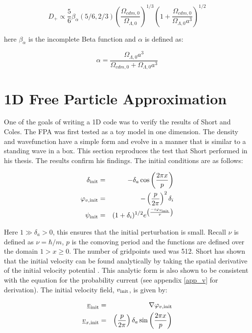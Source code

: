 \begin{equation}
\label{lingro}
D_+ \propto \frac{5}{6} \beta_{\alpha}(5/6, 2/3) \left(\frac{\Omega_{cdm,0}}{\Omega_{\Lambda,0}} \right)^{1/3} \left(1+\frac{\Omega_{cdm,0}}{\Omega_{\Lambda,0}a^3} \right)^{1/2} 
\end{equation}

\noindent here $\beta_{\alpha}$ is the incomplete Beta function and $\alpha$ is defined as:

\begin{equation}
\alpha =  \frac {\Omega_{\Lambda,0}a^3}{\Omega_{cdm,0} + \Omega_{\Lambda,0}a^3}
\end{equation}


\section{1D Free Particle Approximation}
\label{1dpfa}
One of the goals of writing a 1D code was to verify the results of Short and Coles. The FPA was first tested as a toy model in one dimension. The density and wavefunction have a simple form and evolve in a manner that is similar to a standing wave in a box. This section reproduces the test that Short performed in his thesis. The results confirm his findings. The initial conditions are as follows:

\begin{eqnarray}
\label{inits_fpa}
\delta_{\rm init} &=& - \delta_a \cos\left(\frac{2 \pi x}{p} \right) \nonumber \\
\varphi_{v,\rm init} &=& -\left(\frac{p}{2 \pi} \right)^2 \delta_i \nonumber \\
\psi_{\rm init} &=& (1+ \delta_i)^{1/2}e^{\left(\frac{-i\varphi_{v_{\rm init}}}{\nu}\right)}
\end{eqnarray}

\noindent Here $1 \gg \delta_a > 0$, this ensures that the initial perturbation is small. Recall $\nu$ is defined as $\nu = \hbar/m$, $p$ is the comoving period and the functions are defined over the domain $ 1 > x \ge 0$. The number of gridpoints used was 512. Short has shown that the initial velocity can be found analytically by taking the spatial derivative of the initial velocity potential \citep{bib_sho}. This analytic form is also shown to be consistent with the equation for the probability current (see appendix \ref{app_v} for derivation). The initial velocity field, $v_{\rm init}$, is given by:

\begin{eqnarray}
\underline{v}_{\rm init} &=& \nabla \varphi_{v,\rm init} \\
\underline{v}_{x,\rm init} &=& \left(\frac{p}{2 \pi}\right) \delta_a \sin\left(\frac{2 \pi x}{p} \right)
\end{eqnarray}

